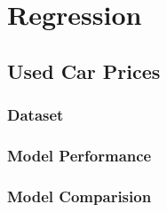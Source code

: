 \chapter{Regression}
\lipsum[2-2]

\section{Used Car Prices}
\lipsum[2-2]

\subsection{Dataset}
\lipsum[2-2]

\subsection{Model Performance}
\lipsum[2-2]

\subsection{Model Comparision}
\lipsum[2-2]
